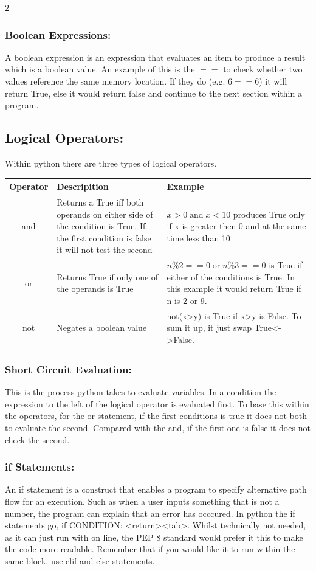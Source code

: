 \documentclass[a4paper]{report}
\begin{document}
\begin{flushleft}
\begin{multicols}{2}
	\subsubsection*{Boolean Expressions:}
	A boolean expression is an expression that evaluates an item to produce a result which is a boolean value. An example of this is the $==$ to check whether two values reference the same memory location. If they do (e.g. $6==6$) it will return True, else it would return false and continue to the next section within a program.

	\subsection*{Logical Operators:}
	Within python there are three types of logical operators.
	\begin{tabular}{|c|p{2.5cm}|p{2.5cm}|}
		\hline
		Operator & Descripition & Example \\
		\hline
		and & \RaggedRight Returns a True iff both operands on either side of the condition is True. If the first condition is false it will not test the second & \RaggedRight $x>0\;\text{and}\;x<10$ produces True only if x is greater then 0 and at the same time less than 10 \\
		\hline
		or & \RaggedRight Returns True if only one of the operands is True & \RaggedRight $n\%2==0\;\text{or}\;n\%3==0$ is True if either of the conditions is True. In this example it would return True if n is 2 or 9. \\
		\hline
		not & \RaggedRight Negates a boolean value & \RaggedRight not(x>y) is True if x>y is False. To sum it up, it just swap True<->False.\\
		\hline
	\end{tabular}
	\subsubsection*{Short  Circuit Evaluation:}
	This is the process python takes to evaluate variables. In a condition the expression to the left of the logical operator is evaluated first. To base this within the operators, for the or statement, if the first conditions is true it does not both to evaluate the second. Compared with the and, if the first one is false it does not check the second.
	\subsubsection*{if Statements:}
	An if statement is a construct that enables a program to specify alternative path flow for an execution. Such as when a user inputs something that is not a number, the program can explain that an error has occcured. In python the if statements go, if CONDITION: <return><tab>. Whilst technically not needed, as it can just run with on line, the PEP 8 standard would prefer it this to make the code more readable. Remember that if you would like it to run within the same block, use elif and else statements.

\end{multicols}
\end{flushleft}
\end{document}
